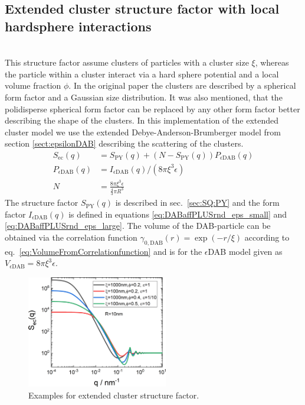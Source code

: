 \subsection{Extended cluster structure factor with local hardsphere
interactions}~\\
\label{sec:SQec}
This structure factor assume clusters of particles with a cluster size $\xi$, whereas the particle within a cluster interact via a hard sphere potential and a local volume fraction $\phi$. In the original paper \cite{Larsen2020} the clusters are described by a spherical form factor and a Gaussian size distribution. It was also mentioned, that the polidisperse spherical form factor can be replaced by any other form factor better describing the shape of the clusters. In this implementation of the extended cluster model we use the extended Debye-Anderson-Brumberger model from section \ref{sect:epsilonDAB} describing the scattering of the clusters.
\begin{align}\label{eq:extendedClusterSQ}
  S_\mathrm{ec}(q) &= S_\mathrm{PY}(q)+\left(N-S_\mathrm{PY}(q)\right)P_{\epsilon\mathrm{DAB}}(q)\\
  P_{\epsilon\mathrm{DAB}}(q) &= I_{\epsilon\mathrm{DAB}}(q) / \left(8\pi\xi^3\epsilon\right)\\
  N &= \frac{8\pi\xi^3\epsilon}{\frac{4}{3}\pi R^3}
\end{align}
The structure factor $S_\mathrm{PY}(q)$ is described in sec.\ \ref{sec:SQ:PY} and the form factor $I_{\epsilon\mathrm{DAB}}(q)$ is defined in equations \ref{eq:DABaffPLUSrnd_eps_small} and \ref{eq:DABaffPLUSrnd_eps_large}. The volume of the DAB-particle can be obtained via the correlation function $\gamma_{0,\mathrm{DAB}}(r)=\exp(-r/\xi)$ according to eq.\ \ref{eq:VolumeFromCorrelationfunction} and is for the $\epsilon$DAB model given as $V_{\epsilon\mathrm{DAB}}=8\pi\xi^3\epsilon$.

\begin{figure}[htb]
\begin{center}
\includegraphics[width=0.55\textwidth]{../images/structure_factor/MassFractals/extendedclusterSQ.png}
\end{center}
\caption{Examples for extended cluster structure factor.}
\label{fig:SQec}
\end{figure}

